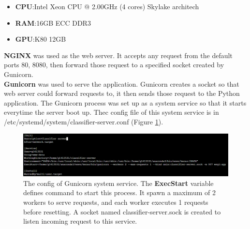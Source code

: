 \begin{itemize}
	\item \textbf{CPU}:Intel Xeon CPU @ 2.00GHz (4 cores) Skylake architech
	\item \textbf{RAM}:16GB ECC DDR3
	\item \textbf{GPU}:K80 12GB
\end{itemize}
\textbf{NGINX} was used as the web server. It accepts any request from the default ports 80, 8080, then forward those request to a specified socket created by Gunicorn.\\
\textbf{Gunicorn} was used to serve the application. Gunicorn creates a socket so that web server could forward requests to, it then sends those request to the Python application. The Gunicorn process was set up as a system service so that it starts everytime the server boot up. Thec config file of this system service is in /etc/systemd/system/classifier-server.conf (Figure \ref{chap4:server_config}).
\begin{center}
    \begin{figure}[H]
    \centering
    \includegraphics[width=1\columnwidth]{images/chap4/server_config.png}
	\caption{The config of Gunicorn system service. The \textbf{ExecStart} variable defines command to start this process. It spawn a maximum of 2 workers to serve requests, and each worker executes 1 requests before resetting. A socket named classifier-server.sock  is created to listen incoming request to this service.}   
	\label{chap4:server_config}
    \end{figure}
\end{center}

